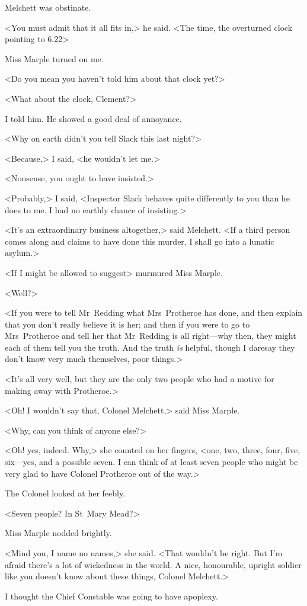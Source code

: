 Melchett was obstinate.

<You must admit that it all fits in,> he said. <The time, the overturned clock pointing to 6.22\longdash>

Miss Marple turned on me.

<Do you mean you haven't told him about that clock yet?>

<What about the clock, Clement?>

I told him. He showed a good deal of annoyance.

<Why on earth didn't you tell Slack this last night?>

<Because,> I said, <he wouldn't let me.>

<Nonsense, you ought to have insisted.>

<Probably,> I said, <Inspector Slack behaves quite differently to you than he does to me. I had no earthly chance of insisting.>

<It's an extraordinary business altogether,> said Melchett. <If a third person comes along and claims to have done this murder, I shall go into a lunatic asylum.>

<If I might be allowed to suggest\longdash> murmured Miss Marple.

<Well?>

<If you were to tell Mr~Redding what Mrs~Protheroe has done, and then explain that you don't really believe it is her; and then if you were to go to Mrs~Protheroe and tell her that Mr~Redding is all right—why then, they might each of them tell you the truth. And the truth \emph{is} helpful, though I daresay they don't know very much themselves, poor things.>

<It's all very well, but they are the only two people who had a motive for making away with Protheroe.>

<Oh! I wouldn't say that, Colonel Melchett,> said Miss Marple.

<Why, can you think of anyone else?>

<Oh! yes, indeed. Why,> she counted on her fingers, <one, two, three, four, five, six—yes, and a possible seven. I can think of at least seven people who might be very glad to have Colonel Protheroe out of the way.>

The Colonel looked at her feebly.

<Seven people? In St~Mary Mead?>

Miss Marple nodded brightly.

<Mind you, I name no names,> she said. <That wouldn't be right. But I'm afraid there's a lot of wickedness in the world. A nice, honourable, upright soldier like you doesn't know about these things, Colonel Melchett.>

I thought the Chief Constable was going to have apoplexy.